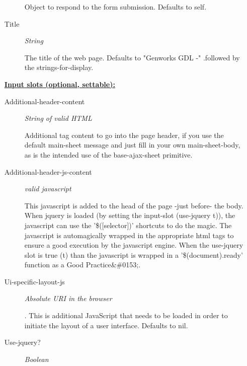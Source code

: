 \documentclass [11pt]{book}
\begin{document}
\begin{itemize}
\begin{description}
 Object to respond to the form submission. Defaults to self.




\item [Title]
\emph{String}

 The title of the web page. Defaults to "Genworks GDL -"
.followed by the strings-for-display.




\end{description}






\textbf{
\underline{Input slots (optional, settable):}}

\begin{description}

\item [Additional-header-content]
\emph{String of valid HTML}

 Additional tag content to go into the page header,
if you use the default main-sheet message and just fill in your own main-sheet-body, as
is the intended use of the base-ajax-sheet primitive.




\item [Additional-header-js-content]
\emph{valid javascript}

 This javascript is added to the head of the page -just before- the body.
When jquery is loaded (by setting the input-slot (use-jquery t)), the javascript can use the
'\$([selector])' shortcuts to do the magic. The javascript is automagically wrapped in the
appropriate html tags to ensure a good execution by the javascript engine. When the use-jquery
slot is true (t) than the javascript is wrapped in a '\$(document).ready' function as a
Good Practice&\#0153;.




\item [Ui-specific-layout-js]
\emph{Absolute URI in the browser}

.
This is additional JavaScript that needs to be loaded in order to initiate the layout of a user
interface. Defaults to nil.




\item [Use-jquery?]
\emph{Boolean}


\end{description}
\end{itemize}
\end{document}

